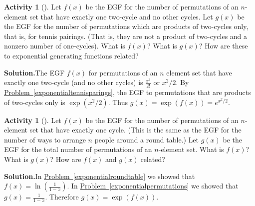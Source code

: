 \documentclass[10pt,]{book}
\theoremstyle{plain}
\theoremstyle{definition}
\newtheorem{activity}[project]{Activity}
\numberwithin{equation}{chapter}
\begin{document}
\begin{activity}[]\label{exp_two-cycle_}
Let \(f(x)\) be the EGF for the number of permutations of an \(n\)-element set that have exactly one two-cycle and no other cycles. Let \(g(x)\) be the EGF for the number of permutations which are products of two-cycles only, that is, for tennis pairings. (That is, they are not a product of two-cycles and a nonzero number of one-cycles). What is \(f(x)\)? What is \(g(x)\)? How are these to exponential generating functions related?%
\par\medskip\noindent%
\textbf{Solution.}\quad The EGF \(f(x)\) for permutations of an \(n\) element set that have exactly one two-cycle (and no other cycles) is \(\frac{x^2}{2!}\) or \(x^2/2\). By \hyperref[exponentialtennisparings]{Problem~\ref{exponentialtennisparings}}, the EGF to permutations that are products of two-cycles only is \(\exp(x^2/2)\). Thus \(g(x)=\exp(f(x))=e^{x^2/2}\).%
\end{activity}
\begin{activity}[]\label{exp_onecycle_}
Let \(f(x)\) be the EGF for the number of permutations of an \(n\)-element set that have exactly one cycle. (This is the same as the EGF for the number of ways to arrange \(n\) people around a round table.) Let \(g(x)\) be the EGF for the total number of permutations of an \(n\)-element set. What is \(f(x)\)? What is \(g(x)\)? How are \(f(x)\) and \(g(x)\) related?%
\par\medskip\noindent%
\textbf{Solution.}\quad In \hyperref[exponentialroundtable]{Problem~\ref{exponentialroundtable}} we showed that \(f(x) =
\ln\left(\frac{1}{1-x}\right)\). In \hyperref[exponentialpermutations]{Problem~\ref{exponentialpermutations}} we showed that \(g(x)=\frac{1}{1-x}\). Therefore \(g(x)= \exp(f(x))\).%
\end{activity}
\end{document}
